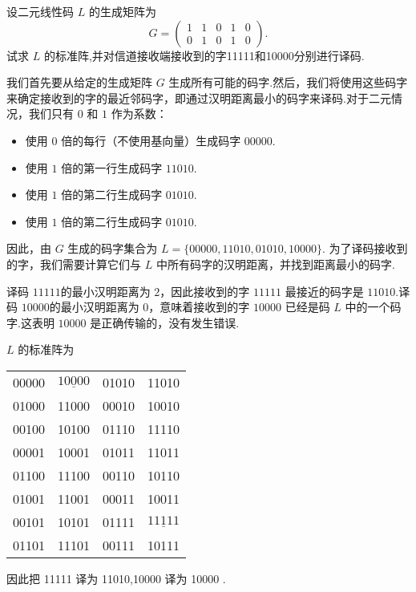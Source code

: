 \begin{exercise}
 设二元线性码 $ L $ 的生成矩阵为
$$
G=\left(\begin{array}{lllll}
1 & 1 & 0 & 1 & 0 \\
0 & 1 & 0 & 1 & 0
\end{array}\right) .
$$
试求 $ L $ 的标准阵,并对信道接收端接收到的字11111和10000分别进行译码.
\end{exercise}
\begin{solution}
我们首先要从给定的生成矩阵 \(G\) 生成所有可能的码字.然后，我们将使用这些码字来确定接收到的字的最近邻码字，即通过汉明距离最小的码字来译码.对于二元情况，我们只有 \(0\) 和 \(1\) 作为系数：
\begin{itemize}
    \item 使用 \(0\) 倍的每行（不使用基向量）生成码字 \(00000\).
    \item 使用 \(1\) 倍的第一行生成码字 \(11010\).
    \item 使用 \(1\) 倍的第二行生成码字 \(01010\).
    \item 使用 \(1\) 倍的第二行生成码字 \(01010\).
\end{itemize}
因此，由 \(G\) 生成的码字集合为 \(L = \{00000, 11010, 01010, 10000\}\).
为了译码接收到的字，我们需要计算它们与 \(L\) 中所有码字的汉明距离，并找到距离最小的码字.

 译码 \(11111\)的最小汉明距离为 \(2\)，因此接收到的字 \(11111\) 最接近的码字是 \(11010\).译码 \(10000\)的最小汉明距离为 \(0\)，意味着接收到的字 \(10000\) 已经是码 \(L\) 中的一个码字.这表明 \(10000\) 是正确传输的，没有发生错误.



    $ L $ 的标准阵为
    \begin{center}
\begin{tabular}{llll}
00000 & $ \underline{10000} $ & 01010 & 11010 \\
01000 & 11000 & 00010 & 10010 \\
00100 & 10100 & 01110 & 11110 \\
00001 & 10001 & 01011 & 11011 \\
01100 & 11100 & 00110 & 10110 \\
01001 & 11001 & 00011 & 10011 \\
00101 & 10101 & 01111 & $ \underline{11111} $ \\
01101 & 11101 & 00111 & 10111
\end{tabular}
\end{center}
因此把 11111 译为 11010,10000 译为 10000 .
\end{solution}

